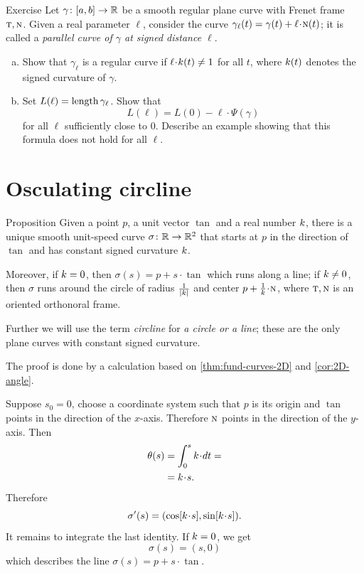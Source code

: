 \begin{thm}{Exercise}\label{ex:length'}
Let $\gamma\colon[a,b]\to\mathbb{R}$ be a smooth regular plane curve with Frenet frame $\textsc{t},\textsc{n}$.
Given a real parameter $\ell$, consider
the curve $\gamma_\ell(t)=\gamma(t)+\ell\cdot\norm(t)$; it is called a \emph{parallel curve of $\gamma$ at signed distance $\ell$}.

\begin{enumerate}[(a)]
\item Show that $\gamma_\ell$ is a regular curve if $\ell\cdot \skur(t)\ne 1$ for all $t$, where $k(t)$ denotes the signed curvature of $\gamma$. 
\item Set $L(\ell)=\mathop{\rm length}\nolimits\gamma_\ell$.
Show that 
\[L(\ell)=L(0)-\ell\cdot\Psi(\gamma)\]
for all $\ell$ sufficiently close to $0$. 
Describe an example showing that this formula does not hold for all $\ell$. 
\end{enumerate}

\end{thm}


\section*{Osculating circline}

\begin{thm}{Proposition}\label{prop:circline}
Given a point $p$,
a unit vector $\tan$ 
and a real number $k$, there is a unique smooth unit-speed curve $\sigma\colon\mathbb{R}\to\mathbb{R}^2$ 
that starts at $p$ in the direction of $\tan$ and has constant signed curvature $k$.

Moreover, if $k=0$, then $\sigma(s)=p+s\cdot \tan$ which runs along a line;
if $k\ne 0$, then $\sigma$ runs around the circle of radius $\tfrac1{|k|}$ and center $p+\tfrac1\skur\cdot \norm$, where $\textsc{t},\textsc{n}$ is an oriented orthonoral frame.
\end{thm}

Further we will use the term \emph{circline} for \emph{a circle or a line};
these are the only plane curves with constant signed curvature.

The proof is done by a calculation based on \ref{thm:fund-curves-2D} and \ref{cor:2D-angle}.

Suppose $s_0=0$, choose a coordinate system such that $p$ is its origin and $\tan$ points in the direction of the $x$-axis. Therefore $\textsc{n}$ points in the direction of the $y$-axis.
Then
\begin{align*}\theta(s)&=\int_{0}^s\skur\cdot dt=
\\
&=\skur\cdot s.
\end{align*}
Therefore
\[\sigma'(s)=(\cos[\skur\cdot s],\sin[\skur\cdot s]).\]
It remains to integrate the last identity.
If $k=0$, we get 
\[\sigma(s)=(s,0)\]
which describes the line $\sigma(s)=p+s\cdot \tan$.

